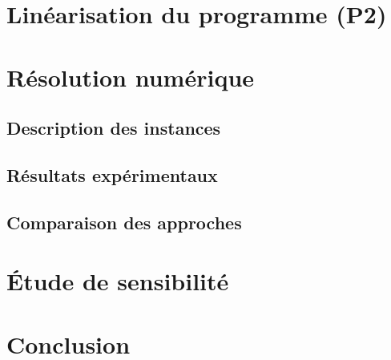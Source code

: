 \documentclass[a4paper,11pt]{article}
\begin{document}
\section{Linéarisation du programme (P2)}

\section{Résolution numérique}
\subsection{Description des instances}
\subsection{Résultats expérimentaux}
\subsection{Comparaison des approches}

\section{Étude de sensibilité}

\section{Conclusion}

\end{document}

